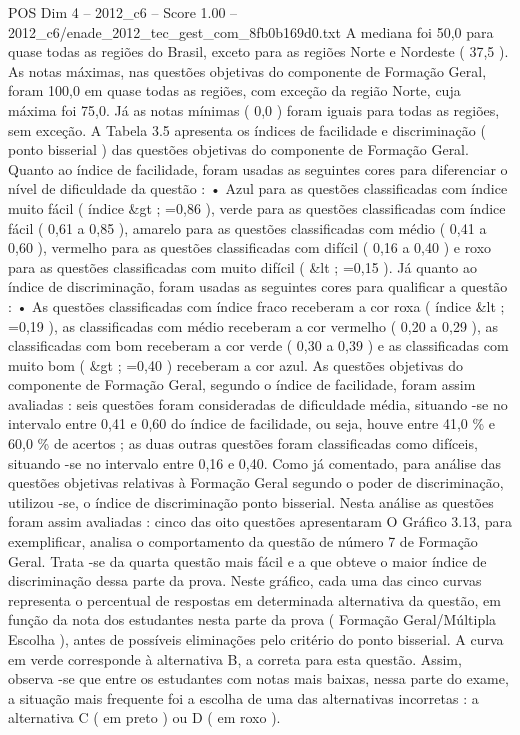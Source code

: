 \begin{textsample}{POS Dim 4 – 2012\_c6 – Score 1.00 – 2012\_c6/enade\_2012\_tec\_gest\_com\_8fb0b169d0.txt}
A mediana foi 50,0 para quase todas as regiões do Brasil, exceto para as regiões Norte e Nordeste ( 37,5 ).
As notas máximas, nas questões objetivas do componente de Formação Geral, foram 100,0 em quase todas as regiões, com exceção da região Norte, cuja máxima foi 75,0.
Já as notas mínimas ( 0,0 ) foram iguais para todas as regiões, sem exceção.
A Tabela 3.5 apresenta os índices de facilidade e discriminação ( ponto bisserial ) das questões objetivas do componente de Formação Geral.
Quanto ao índice de facilidade, foram usadas as seguintes cores para diferenciar o nível de dificuldade da questão : • Azul para as questões classificadas com índice muito fácil ( índice \&gt ; =0,86 ), verde para as questões classificadas com índice fácil ( 0,61 a 0,85 ), amarelo para as questões classificadas com médio ( 0,41 a 0,60 ), vermelho para as questões classificadas com difícil ( 0,16 a 0,40 ) e roxo para as questões classificadas com muito difícil ( \&lt ; =0,15 ).
Já quanto ao índice de discriminação, foram usadas as seguintes cores para qualificar a questão : • As questões classificadas com índice fraco receberam a cor roxa ( índice \&lt ; =0,19 ), as classificadas com médio receberam a cor vermelho ( 0,20 a 0,29 ), as classificadas com bom receberam a cor verde ( 0,30 a 0,39 ) e as classificadas com muito bom ( \&gt ; =0,40 ) receberam a cor azul.
As questões objetivas do componente de Formação Geral, segundo o índice de facilidade, foram assim avaliadas : seis questões foram consideradas de dificuldade média, situando -se no intervalo entre 0,41 e 0,60 do índice de facilidade, ou seja, houve entre 41,0 \% e 60,0 \% de acertos ; as duas outras questões foram classificadas como difíceis, situando -se no intervalo entre 0,16 e 0,40.
Como já comentado, para análise das questões objetivas relativas à Formação Geral segundo o poder de discriminação, utilizou -se, o índice de discriminação ponto bisserial.
Nesta análise as questões foram assim avaliadas : cinco das oito questões apresentaram O Gráfico 3.13, para exemplificar, analisa o comportamento da questão de número 7 de Formação Geral.
Trata -se da quarta questão mais fácil e a que obteve o maior índice de discriminação dessa parte da prova.
Neste gráfico, cada uma das cinco curvas representa o percentual de respostas em determinada alternativa da questão, em função da nota dos estudantes nesta parte da prova ( Formação Geral/Múltipla Escolha ), antes de possíveis eliminações pelo critério do ponto bisserial.
A curva em verde corresponde à alternativa B, a correta para esta questão.
Assim, observa -se que entre os estudantes com notas mais baixas, nessa parte do exame, a situação mais frequente foi a escolha de uma das alternativas incorretas : a alternativa C ( em preto ) ou D ( em roxo ).

\end{textsample}
